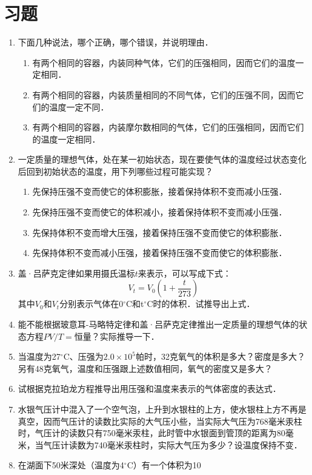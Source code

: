 \section*{习题}
\begin{enumerate}
    \item 下面几种说法，哪个正确，哪个错误，并说明理由．
    \begin{enumerate}
        \item 有两个相同的容器，内装同种气体，它们的压强相同，因而它们的温度一定相同．
        \item 有两个相同的容器，内装质量相同的不同气体，它们的压强不同，因而它们的温度一定不同．
        \item 有两个相同的容器，内装摩尔数相同的气体，它们的压强相同，因而它们的温度一定相同．
    \end{enumerate}
\item 一定质量的理想气体，处在某一初始状态，现在要使气体的温度经过状态变化后回到初始状态的温度，用下列哪些过程可能实现？
\begin{enumerate}
    \item 先保持压强不变而使它的体积膨胀，接着保持体积不变而减小压强．
\item 先保持压强不变而使它的体积减小，接着保持体积不变而减小压强．
\item 先保持体积不变而增大压强，接着保持压强不变而使它的体积膨胀．
\item 先保持体积不变而减小压强，接着保持压强不变而使它的体积膨胀．     
\end{enumerate}
\item 盖·吕萨克定律如果用摄氏温标$t$来表示，可以写成下式：
\[V_t=V_0\left(1+\frac{t}{273}\right) \]
其中$V_0$和$V_t$分别表示气体在0$^\circ$C和t$^\circ$C时的体积．试推导出上式．
\item 能不能根据玻意耳-马略特定律和盖·吕萨克定律推出一定质量的理想气体的状态方程$PV/T=$恒量？实际推导一下．
\item 当温度为27$^\circ$C、压强为$2.0\times 10^5$帕时，32克氧气的体积是多大？密度是多大？另有48克氧气，温度和压强跟上述数值相同，氧气的密度又是多大？    
\item   试根据克拉珀龙方程推导出用压强和温度来表示的气体密度的表达式．
\item  水银气压计中混入了一个空气泡，上升到水银柱的上方，使水银柱上方不再是真空，因而气压计的读数比实际的大气压小些，当实际大气压为768毫米汞柱时，气压计的读数只有750毫米汞柱，此时管中水银面到管顶的距离为80毫米，当气压计读数为740毫米汞柱时，实际大气压为多少？设温度保持不变．
\item  在湖面下50米深处（温度为4$^\circ$C）有一个体积为10

\end{enumerate}
